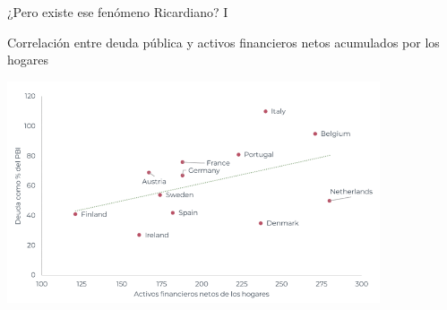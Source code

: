 \documentclass{beamer}
\begin{document}
\begin{frame}{¿Pero existe ese fenómeno Ricardiano? I}
    \begin{center}
        Correlación entre deuda pública y activos financieros netos acumulados por los hogares
    \end{center}
    \centering\includegraphics[width=11cm]{../Figures/C41.6.png}\  
\end{frame}
\end{document}
